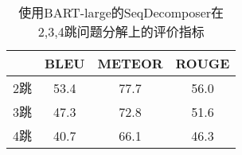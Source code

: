\begin{table}[htbp]
    \centering
    \caption{使用BART-large的SeqDecomposer在2,3,4跳问题分解上的评价指标}
    \begin{tabular}{lccc}
    \hline
    & BLEU & METEOR & ROUGE \\
    \hline
    2跳 & 53.4 & 77.7 & 56.0 \\
    3跳 & 47.3 & 72.8 & 51.6 \\
    4跳 & 40.7 & 66.1 & 46.3 \\
    \hline
    \end{tabular}
    \label{tab:5-3}
\end{table}
